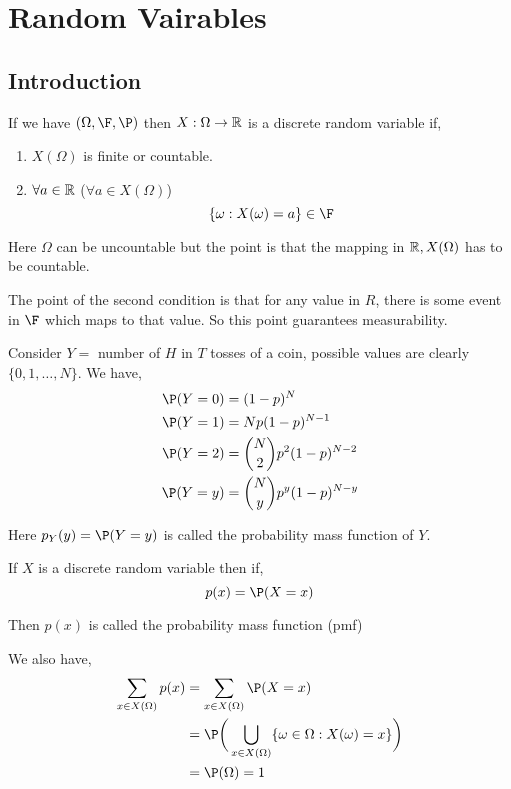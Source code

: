 \chapter{Random Vairables}

\section{Introduction}

\begin{definition}
    If we have $(\Omega, \F, \P)$ then  $X: \Omega \to \mathbb{R}$ is a discrete random variable if,

    \begin{enumerate}
        \item $X(\Omega)$ is finite or countable.
        \item  $\forall a \in \mathbb{R}$ ($\forall a \in X(\Omega)$)
            $$  \{\omega: X(\omega) = a\} \in \F $$ 
    \end{enumerate}
\end{definition}
\begin{remark}
	Here $\Omega$ can be uncountable but the point is that the mapping in $\mathbb{R}, X(\Omega)$ has to be countable.
\end{remark}
\begin{remark}
	The point of the second condition is that for any value in $R$, there is some event in $\F$ which maps to that value. So this point guarantees measurability. 
\end{remark}

\begin{eg}
    Consider $Y = $ number of $H$ in $T$ tosses of a coin, possible values are clearly  $\{0, 1, \dots, N\}$. We have, 
    \begin{align*}
        \P(Y = 0) &= (1 - p)^{N} \\
        \P(Y = 1) &= N p(1 - p)^{N - 1} \\
        \P(Y = 2) &= {N \choose 2} p^2(1 - p)^{N - 2} \\
        \P(Y = y) &= {N \choose y} p^y(1 - p)^{N - y}
    \end{align*}
\end{eg}

\begin{remark}
    Here $p_Y(y) = \P(Y = y)$ is called the probability mass function of  $Y$.
\end{remark}

\begin{definition}
    If $X$ is a discrete random variable then if,
    $$ p(x)= \P(X = x) $$ 

    Then $p(x)$ is called the probability mass function (pmf)
\end{definition}
\begin{remark}
	We also have, 
	\begin{align*}
		\sum_{x \in X(\Omega)} p(x) &= \sum_{x \in X(\Omega)} \P(X = x) \\
					    &=  \P \bigg (\bigcup_{x \in X(\Omega)} \{\omega \in \Omega: X(\omega) = x\} \bigg) \\
					    &= \P(\Omega) = 1
	\end{align*}
\end{remark}
